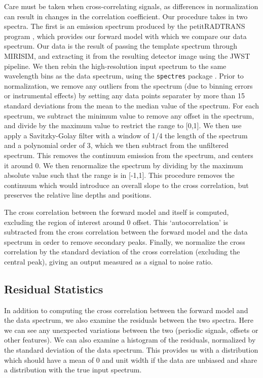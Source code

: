 Care must be taken when cross-correlating signals, as differences in normalization can result in changes in the correlation coefficient. 
Our procedure takes in two spectra. 
The first is an emission spectrum produced by the petitRADTRANS program \parencite{Molliere2019}, which provides our forward model with which we compare our data spectrum.
Our data is the result of passing the template spectrum through MIRISIM, and extracting it from the resulting detector image using the JWST pipeline.
We then rebin the high-resolution input spectrum to the same wavelength bins as the data spectrum, using the \verb|spectres| package \parencite{Carnall2017}.
Prior to normalization, we remove any outliers from the spectrum (due to binning errors or instrumental effects) by setting any data points separater by more than 15 standard deviations from the mean to the median value of the spectrum.
For each spectrum, we subtract the minimum value to remove any offset in the spectrum, and divide by the maximum value to restrict the range to [0,1]. 
We then use apply a Savitzky-Golay filter with a window of 1/4 the length of the spectrum and a polynomial order of 3, which we then subtract from the unfiltered spectrum. 
This removes the continuum emission from the spectrum, and centers it around 0.
We then renormalize the spectrum by dividing by the maximum absolute value such that the range is in [-1,1]. 
This procedure removes the continuum which would introduce an overall slope to the cross correlation, but preserves the relative line depths and positions.

The cross correlation between the forward model and itself is computed, excluding the region of interest around 0 offset. 
This `autocorrelation' is subtracted from the cross correlation between the forward model and the data spectrum in order to remove secondary peaks.
Finally, we normalize the cross correlation by the standard deviation of the cross correlation (excluding the central peak), giving an output measured as a signal to noise ratio.

\subsection{Residual Statistics}
In addition to computing the cross correlation between the forward model and the data spectrum, we also examine the residuals between the two spectra.
Here we can see any unexpected variations between the two (periodic signals, offsets or other features).
We can also examine a histogram of the residuals, normalized by the standard deviation of the data spectrum.
This provides us with a  distribution which should have a mean of 0 and unit width if the data are unbiased and share a distribution with the true input spectrum.


